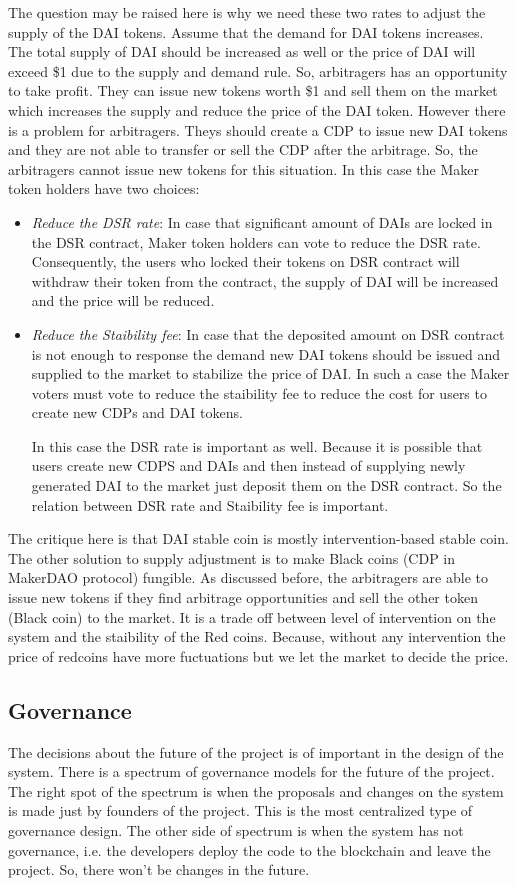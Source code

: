 The question may be raised here is why we need these two rates to adjust the supply of the DAI tokens. Assume that the demand for DAI tokens increases. The total supply of DAI should be increased as well or the price of DAI will exceed \$1 due to the supply and demand rule. So, arbitragers has an opportunity to take profit. They can issue new tokens worth \$1 and sell them on the market which increases the supply and reduce the price of the DAI token. However there is a problem for arbitragers. Theys should create a CDP to issue new DAI tokens and they are not able to transfer or sell the CDP after the arbitrage. So, the arbitragers cannot issue new tokens for this situation. In this case the Maker token holders have two choices:
\begin{itemize}
	\item \emph{Reduce the DSR rate}: In case that significant amount of DAIs are locked in the DSR contract, Maker token holders can vote to reduce the DSR rate. Consequently, the users who locked their tokens on DSR contract will withdraw their token from the contract, the supply of DAI will be increased and the price will be reduced. 
	\item \emph{ Reduce the Staibility fee}: In case that the deposited amount on DSR contract is not enough to response the demand new DAI tokens should be issued and supplied to the market to stabilize the price of DAI. In such a case the Maker voters must vote to reduce the staibility fee to reduce the cost for users to create new CDPs and DAI tokens. 
	
In this case the DSR rate is important as well. Because it is possible that users create new CDPS and DAIs and then instead of supplying newly generated DAI to the market just deposit them on the DSR contract. So the relation between DSR rate and Staibility fee is important. 
\end{itemize}

The critique here is that DAI stable coin is mostly intervention-based stable coin. The other solution to supply adjustment is to make Black coins (CDP in MakerDAO protocol) fungible. As discussed before, the arbitragers are able to issue new tokens if they find arbitrage opportunities and sell the other token (Black coin) to the market. It is a trade off between level of intervention on the system and the staibility of the Red coins. Because, without any intervention the price of redcoins have more fuctuations but we let the market to decide the price. 

\subsection{Governance}
The decisions about the future of the project is of important in the design of the system. There is a spectrum of governance models for the future of the project. The right spot of the spectrum is when the proposals and changes on the system is made just by founders of the project. This is the most centralized type of governance design. The other side of spectrum is when the system has not governance, i.e. the developers deploy the code to the blockchain and leave the project. So, there won't be changes in the future.

